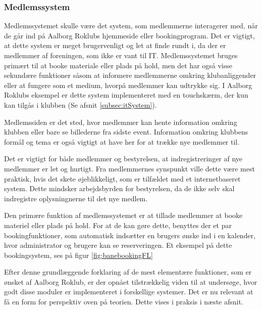 \subsubsection{Medlemssystem}
Medlemssystemet skulle være det system, som medlemmerne interagerer med, når de går ind på Aalborg Roklubs hjemmeside eller bookingprogram. Det er vigtigt, at dette system er meget brugervenligt og let at finde rundt i, da der er medlemmer af foreningen, som ikke er vant til IT. Medlemssystemet bruges primært til at booke materiale eller plads på hold, men det har også visse sekundære funktioner såsom at informere medlemmerne omkring klubanliggender eller at fungere som et medium, hvorpå medlemmer kan udtrykke sig. I Aalborg Roklubs eksempel er dette system implementeret med en touchskærm, der kun kan tilgås i klubben (Se afsnit \ref{subsec:itSystem}).

Medlemssiden er det sted, hvor medlemmer kan hente information omkring klubben eller bare se billederne fra sidste event. Information omkring klubbens formål og tema er også vigtigt at have her for at trække nye medlemmer til. 

Det er vigtigt for både medlemmer og bestyrelsen, at indregistreringer af nye medlemmer er let og hurtigt. Fra medlemmernes synspunkt ville dette være mest praktisk, hvis det skete øjeblikkeligt, som er tilfældet med et internetbaseret system. Dette mindsker arbejdsbyrden for bestyrelsen, da de ikke selv skal indregistre oplysningnerne til det nye medlem.

Den primære funktion af medlemssystemet er at tillade medlemmer at booke materiel eller plads på hold. For at de kan gøre dette, benyttes der et par bookingfunktioner, som automatisk indsætter en brugers ønske ind i en kalender, hvor administrator og brugere kan se reserveringen. Et eksempel på dette bookingsystem, ses på figur \ref{fig:banebookingFL}


Efter denne grundlæggende forklaring af de mest elementære funktioner, som er ønsket af Aalborg Roklub, er der opnået tilstrækkelig viden til at undersøge, hvor godt disse moduler er implementeret i forskellige systemer. Det er nu relevant at få en form for perspektiv oven på teorien. Dette vises i praksis i næste afsnit.

